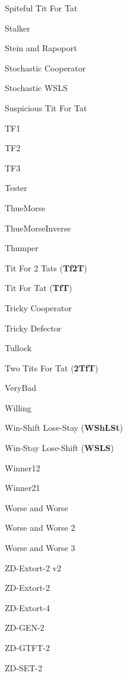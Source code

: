 \item Spiteful Tit For Tat~\cite{prison}
\item Stalker~\cite{Andre2013}
\item Stein and Rapoport~\cite{Axelrod1980a}
\item Stochastic Cooperator~\cite{Adami2013}
\item Stochastic WSLS~\cite{axelrodproject}
\item Suspicious Tit For Tat~\cite{Beaufils1997, Hilbe2013}
\item TF1~\cite{axelrodproject}
\item TF2~\cite{axelrodproject}
\item TF3~\cite{axelrodproject}
\item Tester~\cite{Axelrod1980b}
\item ThueMorse~\cite{axelrodproject}
\item ThueMorseInverse~\cite{axelrodproject}
\item Thumper~\cite{Ashlock2008}
\item Tit For 2 Tats (\textbf{Tf2T})~\cite{Axelrod1981}
\item Tit For Tat (\textbf{TfT})~\cite{Axelrod1980a}
\item Tricky Cooperator~\cite{axelrodproject}
\item Tricky Defector~\cite{axelrodproject}
\item Tullock~\cite{Axelrod1980a}
\item Two Tits For Tat (\textbf{2TfT})~\cite{Axelrod1981}
\item VeryBad~\cite{Andre2013}
\item Willing \cite{Van2015}
\item Win-Shift Lose-Stay (\textbf{WShLSt})~\cite{Li2011}
\item Win-Stay Lose-Shift (\textbf{WSLS})~\cite{Kraines1989, Nowak1993, Stewart2012}
\item Winner12~\cite{mathieu2017}
\item Winner21~\cite{mathieu2017}
\item Worse and Worse\cite{prison}
\item Worse and Worse 2\cite{prison}
\item Worse and Worse 3\cite{prison}
\item ZD-Extort-2 v2~\cite{Kuhn2017}
\item ZD-Extort-2~\cite{Stewart2012}
\item ZD-Extort-4~\cite{axelrodproject}
\item ZD-GEN-2~\cite{Kuhn2017}
\item ZD-GTFT-2~\cite{Stewart2012}
\item ZD-SET-2~\cite{Kuhn2017}